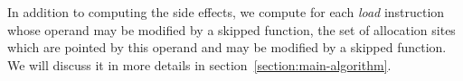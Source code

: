 In addition to computing the side effects,
we compute for each \textit{load} instruction whose operand may be modified by a skipped function,
the set of allocation sites which are pointed by this operand and may be modified by a skipped function.
We will discuss it in more details in section~\ref{section:main-algorithm}.


